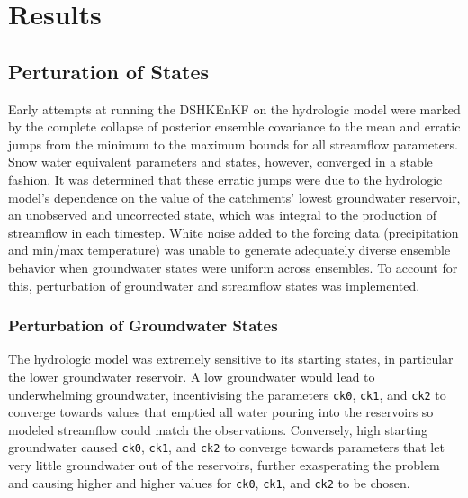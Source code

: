 \chapter{Results}

\section{Perturation of States}
\label{sec:perturbation_of_states}
Early attempts at running the DSHKEnKF on the hydrologic model were marked by the complete collapse of posterior ensemble covariance to the mean and erratic jumps from the minimum to the maximum bounds for all streamflow parameters. Snow water equivalent parameters and states, however, converged in a stable fashion. It was determined that these erratic jumps were due to the hydrologic model's dependence on the value of the catchments' lowest groundwater reservoir, an unobserved and uncorrected state, which was integral to the production of streamflow in each timestep. White noise added to the forcing data (precipitation and min/max temperature) was unable to generate adequately diverse ensemble behavior when groundwater states were uniform across ensembles. To account for this, perturbation of groundwater and streamflow states was implemented.

\subsection{Perturbation of Groundwater States}

The hydrologic model was extremely sensitive to its starting states, in particular the lower groundwater reservoir. A low groundwater would lead to underwhelming groundwater, incentivising the parameters \texttt{ck0}, \texttt{ck1}, and \texttt{ck2} to converge towards values that emptied all water pouring into the reservoirs so modeled streamflow could match the observations. Conversely, high starting groundwater caused \texttt{ck0}, \texttt{ck1}, and \texttt{ck2} to converge towards parameters that let very little groundwater out of the reservoirs, further exasperating the problem and causing higher and higher values for \texttt{ck0}, \texttt{ck1}, and \texttt{ck2} to be chosen. 

